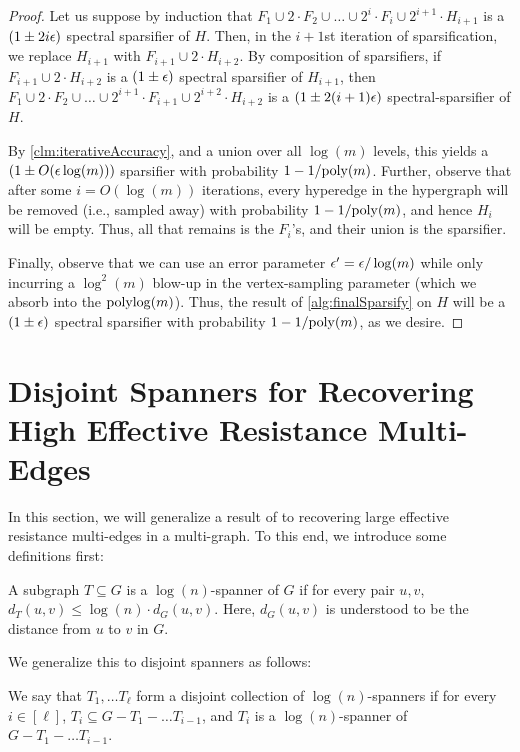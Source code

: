 \documentclass{article}
\begin{document}
\begin{proof}
    Let us suppose by induction that $F_1 \cup 2 \cdot F_2 \cup \dots \cup 2^i \cdot F_i \cup 2^{i+1} \cdot H_{i+1}$ is a $(1 \pm 2i \epsilon)$ spectral sparsifier of $H$. Then, in the $i+1$st iteration of sparsification, we replace $H_{i+1}$ with $F_{i+1} \cup 2 \cdot H_{i+2}$. By composition of sparsifiers, if $F_{i+1} \cup 2 \cdot H_{i+2}$ is a $(1 \pm \epsilon)$ spectral sparsifier of $H_{i+1}$, then $F_1 \cup 2 \cdot F_2 \cup \dots \cup 2^{i+1} \cdot F_{i+1} \cup 2^{i+2} \cdot H_{i+2}$ is a $(1 \pm 2(i+1)\epsilon)$ spectral-sparsifier of $H$.

    By \cref{clm:iterativeAccuracy}, and a union over all $\log(m)$ levels, this yields a $(1 \pm O(\epsilon \log(m)))$ sparsifier with probability $1 - 1 / \mathrm{poly}(m)$. Further, observe that after some $i = O(\log(m))$ iterations, every hyperedge in the hypergraph will be removed (i.e., sampled away) with probability $1 - 1 / \mathrm{poly}(m)$, and hence $H_i$ will be empty. Thus, all that remains is the $F_i$'s, and their union is the sparsifier.

    Finally, observe that we can use an error parameter $\epsilon' = \epsilon / \log(m)$ while only incurring a $\log^2(m)$ blow-up in the vertex-sampling parameter (which we absorb into the $\operatorname{polylog}(m)$). Thus, the result of \cref{alg:finalSparsify} on $H$ will be a $(1 \pm \epsilon)$ spectral sparsifier with probability $1 - 1 / \mathrm{poly}(m)$, as we desire.
\end{proof}

\section{Disjoint Spanners for Recovering High Effective Resistance Multi-Edges}\label{sec:9}

In this section, we will generalize a result of \cite{ADKKP16} to recovering large effective resistance multi-edges in a multi-graph. To this end, we introduce some definitions first:

\begin{definition}
    A subgraph $T \subseteq G$ is a $\log(n)$-spanner of $G$ if for every pair $u,v$, $d_{T}(u,v) \leq \log(n) \cdot d_G(u,v)$. Here, $d_G(u,v)$ is understood to be the distance from $u$ to $v$ in $G$.
\end{definition}

We generalize this to disjoint spanners as follows:

\begin{definition}
    We say that $T_1, \dots T_{\ell}$ form a disjoint collection of $\log(n)$-spanners if for every $i \in [\ell]$, $T_{i} \subseteq G - T_{1} - \dots T_{i-1}$, and $T_i$ is a $\log(n)$-spanner of $G - T_{1} - \dots T_{i-1}$.
\end{definition}
\end{document}
